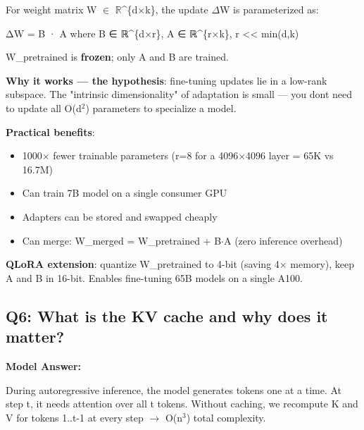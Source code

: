 \documentclass[11pt]{article}
\providecommand{\tightlist}{\setlength{\itemsep}{1pt}\setlength{\parskip}{0pt}}
\newenvironment{Shaded}{\begin{snugshade}}{\end{snugshade}}
\newcommand{\BuiltInTok}[1]{\textcolor[rgb]{0.50,0.55,0.55}{#1}}
\newcommand{\NormalTok}[1]{\textcolor[rgb]{0.81,0.81,0.76}{#1}}
\newcommand{\OperatorTok}[1]{\textcolor[rgb]{0.81,0.81,0.76}{#1}}
\begin{document}
For weight matrix W \(\in\) \(\mathbb{R}\)\^{}\{d\(\times\)k\}, the update \(\Delta\)W is parameterized as:


\begin{Shaded}
\begin{Highlighting}[]
\NormalTok{ΔW }\OperatorTok{=}\NormalTok{ B · A    where B ∈ ℝ}\OperatorTok{\^{}}\NormalTok{\{d×r\}, A ∈ ℝ}\OperatorTok{\^{}}\NormalTok{\{r×k\}, r }\OperatorTok{\textless{}\textless{}} \BuiltInTok{min}\NormalTok{(d,k)}
\end{Highlighting}
\end{Shaded}

W\_pretrained is \textbf{frozen}; only A and B are trained.

\textbf{Why it works --- the hypothesis}: fine-tuning updates lie in a low-rank subspace. The "intrinsic dimensionality" of adaptation is small --- you don\textquotesingle t need to update all O(d\(^2\)) parameters to specialize a model.

\textbf{Practical benefits}:

\begin{itemize}
\tightlist
\item
  1000\(\times\) fewer trainable parameters (r=8 for a 4096\(\times\)4096 layer = 65K vs 16.7M)
\item
  Can train 7B model on a single consumer GPU
\item
  Adapters can be stored and swapped cheaply
\item
  Can merge: W\_merged = W\_pretrained + B\(\cdot\)A (zero inference overhead)
\end{itemize}

\textbf{QLoRA extension}: quantize W\_pretrained to 4-bit (saving 4\(\times\) memory), keep A and B in 16-bit. Enables fine-tuning 65B models on a single A100.

\subsection{Q6: What is the KV cache and why does it matter?}\label{q6-what-is-the-kv-cache-and-why-does-it-matter}

\textbf{Model Answer:}

During autoregressive inference, the model generates tokens one at a time. At step t, it needs attention over all t tokens. Without caching, we recompute K and V for tokens 1..t-1 at every step \(\rightarrow\) O(n\(^3\)) total complexity.
\end{document}
